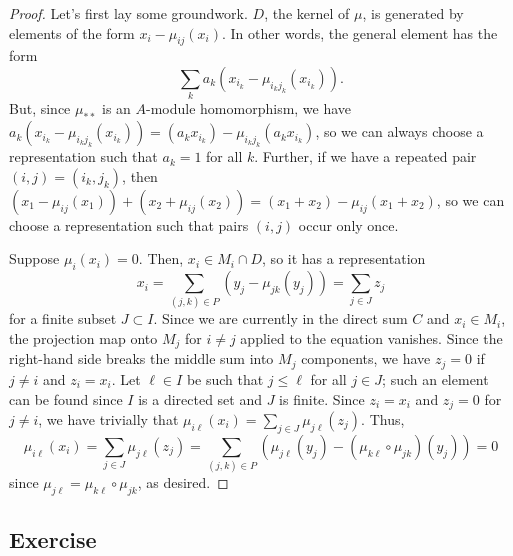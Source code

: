 \begin{proof}
Let's first lay some groundwork. $D$, the kernel of $\mu$, is generated by elements of the form $x_i - \mu_{ij}(x_i)$. In other words, the general element has the form
$$\sum_k a_k(x_{i_k} - \mu_{i_k j_k}(x_{i_k})).$$
But, since $\mu_{**}$ is an $A$-module homomorphism, we have $a_k(x_{i_k} - \mu_{i_k j_k}(x_{i_k})) = (a_k x_{i_k}) - \mu_{i_k j_k}(a_k x_{i_k})$, so we can always choose a representation
such that $a_k = 1$ for all $k$. Further, if we have a repeated pair $(i,j) = (i_k,j_k)$, then $(x_1 - \mu_{ij}(x_1)) + (x_2 + \mu_{ij}(x_2)) = (x_1 + x_2) - \mu_{ij}(x_1 + x_2)$, so we can
choose a representation such that pairs $(i,j)$ occur only once.

Suppose $\mu_i(x_i) = 0$. Then, $x_i \in M_i \cap D$, so it has a representation
$$x_i = \sum_{(j,k) \in P}(y_j - \mu_{jk}(y_j)) = \sum_{j \in J} z_j$$
for a finite subset $J \subset I$. Since we are currently in the direct sum $C$ and $x_i \in M_i$, the projection map onto $M_j$ for $i \neq j$ applied to the equation vanishes. Since the right-hand side breaks the middle
sum into $M_j$ components, we have $z_j = 0$ if $j \neq i$ and $z_i = x_i$. Let $\ell \in I$ be such that $j \le \ell$ for all $j\in J$; such an element can be found since $I$ is a directed set and $J$
is finite. Since $z_i = x_i$ and $z_j = 0$ for $j \neq i$, we have trivially that $\mu_{i\ell}(x_i) = \sum_{j \in J}\mu_{j\ell}(z_j)$. Thus,
$$\mu_{i\ell}(x_i) = \sum_{j \in J}\mu_{j\ell}(z_j) = \sum_{(j,k) \in P}(\mu_{j\ell}(y_j) - (\mu_{k\ell}\circ\mu_{jk})(y_j)) 
= 0$$
since $\mu_{j\ell} = \mu_{k\ell}\circ\mu_{jk}$, as desired.
\end{proof}

\subsection{Exercise}\label{2.16} %


